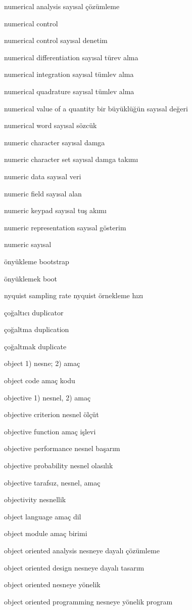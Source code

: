 \documentclass[12pt,fleqn]{article}\usepackage{../../common}
\begin{document}
numerical analysis sayısal çözümleme

numerical control

numerical control sayısal denetim

numerical differentiation sayısal türev alma

numerical integration sayısal tümlev alma

numerical quadrature sayısal tümlev alma

numerical value of a quantity bir büyüklüğün sayısal değeri

numerical word sayısal sözcük

numeric character sayısal damga

numeric character set sayısal damga takımı

numeric data sayısal veri

numeric field sayısal alan

numeric keypad sayısal tuş akımı

numeric representation sayısal gösterim

numeric sayısal

önyükleme bootstrap

önyüklemek boot

nyquist sampling rate nyquist örnekleme hızı

çoğaltıcı duplicator

çoğaltma duplication

çoğaltmak duplicate

object 1) nesne; 2) amaç

object code amaç kodu

objective 1) nesnel, 2) amaç

objective criterion nesnel ölçüt

objective function amaç işlevi

objective performance nesnel başarım

objective probability nesnel olasılık

objective tarafsız, nesnel, amaç

objectivity nesnellik

object language amaç dil

object module amaç birimi

object oriented analysis nesneye dayalı çözümleme

object oriented design nesneye dayalı tasarım

object oriented nesneye yönelik

object oriented programming nesneye yönelik program
\end{document}
